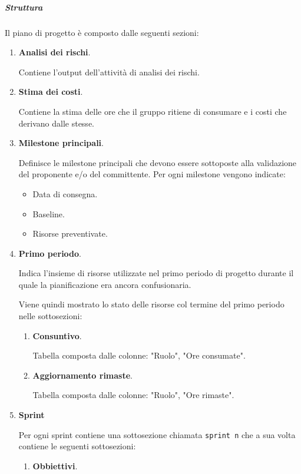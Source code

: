 \subparagraph{Struttura}
\label{subsec:struttura_piano}
Il piano di progetto è composto dalle seguenti sezioni:
\begin{enumerate}
    \item \textbf{Analisi dei rischi}.
    
    Contiene l'output dell'attività di analisi dei rischi.

    \item \textbf{Stima dei costi}.
    
    Contiene la stima delle ore che il gruppo ritiene di consumare e i costi che derivano dalle stesse. 
    
    \item \textbf{Milestone principali}.
    
    Definisce le milestone principali che devono essere sottoposte alla validazione del proponente e/o del committente.
    Per ogni milestone vengono indicate:
    \begin{itemize}
        \item Data di consegna.
        \item Baseline.
        \item Risorse preventivate.
    \end{itemize}
    
    \item \textbf{Primo periodo}. \label{par:primo_periodo}
    
    Indica l'insieme di risorse utilizzate nel primo periodo di progetto durante il quale la pianificazione era ancora confusionaria.
    
    Viene quindi mostrato lo stato delle risorse col termine del primo periodo nelle sottosezioni:
    \begin{enumerate}
        \item \textbf{Consuntivo}.
        
        Tabella composta dalle colonne: "Ruolo", "Ore consumate".

        \item \textbf{Aggiornamento rimaste}.
        
        Tabella composta dalle colonne: "Ruolo", "Ore rimaste".
    \end{enumerate}
    
    \item \textbf{Sprint} \label{par:sprint}
    
    Per ogni sprint contiene una sottosezione chiamata \texttt{sprint n} che a sua volta contiene le seguenti sottosezioni:
    \begin{enumerate}
        \item \textbf{Obbiettivi}.
        

\end{enumerate}
\end{enumerate}
